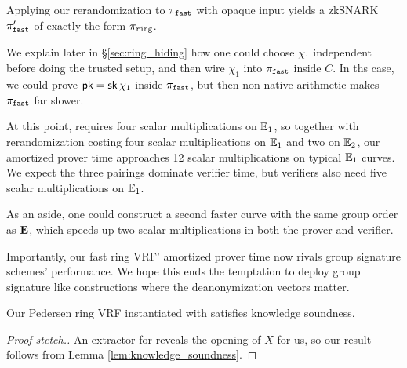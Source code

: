 Applying our rerandomization to $\pi_{\mathtt{fast}}$ with opaque input yields
a zkSNARK $\pi_{\mathtt{fast}}'$ of exactly the form $\pi_{\mathtt{ring}}$.

We explain later in \S\ref{sec:ring_hiding} how one could
choose $\chi_1$ independent before doing the trusted setup,
 and then wire $\chi_1$ into $\pi_{\mathtt{fast}}$ inside $C$.
In ths case, we could prove $\mathsf{pk} = \mathsf{sk}\, \chi_1$ inside $\pi_{\mathtt{fast}}$, but then
non-native arithmetic makes $\pi_{\mathtt{fast}}$ far slower.

At this point, \PedVRF requires four scalar multiplications on ${\mathbb{E}}_1$,
so together with rerandomization costing four scalar multiplications
on ${\mathbb{E}}_1$ and two on ${\mathbb{E}}_2$, our amortized prover time
 approaches 12 scalar multiplications on typical ${\mathbb{E}}_1$ curves. 
We expect the three pairings dominate verifier time, but
 verifiers also need five scalar multiplications on ${\mathbb{E}}_1$.

As an aside, one could construct a second faster curve with the same
group order as ${\mathbf{E}}$, which speeds up two scalar multiplications
 in both the prover and verifier. 

Importantly, our fast ring VRF' amortized prover time now rivals
group signature schemes' performance.  We hope this ends the temptation
to deploy group signature like constructions where the deanonymization vectors matter.

\begin{theorem}\label{thm:knowledge_soundness}
Our Pedersen ring VRF instantiated with \pifast satisfies knowledge soundness.
\end{theorem}

\begin{proof}[Proof stetch.]
An extractor for \PedVRF reveals the opening of $X$ for us,
so our result follows from Lemma \ref{lem:knowledge_soundness}.
\end{proof}


%

